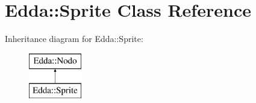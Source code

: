 \hypertarget{class_edda_1_1_sprite}{
\section{Edda::Sprite Class Reference}
\label{class_edda_1_1_sprite}
}
Inheritance diagram for Edda::Sprite:\begin{figure}[H]
\begin{center}
\leavevmode
\includegraphics[height=2.000000cm]{class_edda_1_1_sprite}
\end{center}
\end{figure}
